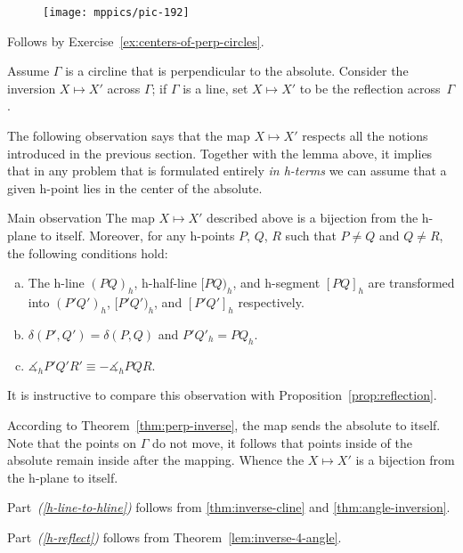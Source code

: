 \begin{figure}
\vskip-4mm
\centering
\texttt{[image: mppics/pic-192]}
\end{figure}

Follows by Exercise~\ref{ex:centers-of-perp-circles}.
\qeds

Assume $\Gamma$ is a circline that is perpendicular to the absolute.
Consider the inversion $X\mapsto X'$ across $\Gamma$;
if $\Gamma$ is a line, set $X\mapsto X'$ to be the reflection across~$\Gamma$.

The following observation says that the map $X\mapsto X'$ respects all the notions introduced in the previous section.
Together with the lemma above, it implies that in any problem that is formulated entirely \textit{in h-terms} we can assume that a given h-point lies in the center of the absolute.

\begin{thm}{Main observation}\label{thm:main-observ}
The map $X\mapsto X'$ described above is a bijection from the h-plane to itself. 
Moreover, for any h-points $P$, $Q$, $R$ such that $P\ne Q$ and $Q\ne R$, the following conditions hold:
\begin{enumerate}[(a)]
\item\label{h-line-to-hline} The h-line $(PQ)_h$, h-half-line $[PQ)_h$, and h-segment $[PQ]_h$ are transformed into $(P'Q')_h$, $[P'Q')_h$, and $[P'Q']_h$ respectively.
\item\label{h-reflect} $\delta(P',Q')=\delta(P,Q)$ and $P'Q'_h=PQ_h$.
\item\label{h-angle-mes} 
$\measuredangle_h P'Q'R'\equiv-\measuredangle_h PQR$.
\end{enumerate}

\end{thm}

It is instructive to compare this observation with Proposition~\ref{prop:reflection}.

According to Theorem~\ref{thm:perp-inverse}, the map sends the absolute to itself. 
Note that the points on $\Gamma$ do not move, it follows that points inside of the absolute remain inside after the mapping.
Whence the $X\mapsto X'$ is a bijection from the h-plane to itself.


Part~\textit{(\ref{h-line-to-hline})} follows from \ref{thm:inverse-cline} and \ref{thm:angle-inversion}.

Part~\textit{(\ref{h-reflect})} follows from Theorem~\ref{lem:inverse-4-angle}.

